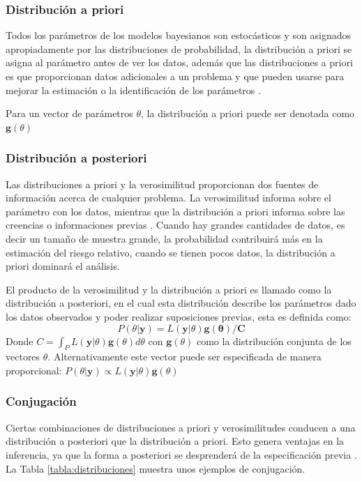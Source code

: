 \subsubsection{Distribución a priori}
Todos los parámetros de los modelos bayesianos son estocásticos y son asignados apropiadamente por las distribuciones de probabilidad, la distribución a priori se asigna al parámetro antes de ver los datos, además que las distribuciones a priori es que proporcionan datos adicionales a un problema y que pueden usarse para mejorar la estimación o la identificación de los parámetros \citep{lawson2018bayesian}.

Para un vector de parámetros $\theta$, la distribución a priori puede ser denotada como $\mathbf{g}(\theta)$

\subsubsection{Distribución a posteriori}
Las distribuciones a priori y la verosimilitud proporcionan dos fuentes de información acerca de cualquier problema. La verosimilitud informa sobre el parámetro con los datos, mientras que la distribución a priori informa sobre las creencias o informaciones previas \citep{lawson2018bayesian}. Cuando hay grandes cantidades de datos, es decir un tamaño de muestra grande, la probabilidad contribuirá más en la estimación del riesgo relativo, cuando se tienen pocos datos, la distribución a priori dominará el análisis.

El producto de la verosimilitud y la distribución a priori es llamado como la distribución a posteriori, en el cual esta distribución describe los parámetros dado los datos observados y poder realizar suposiciones previas, esta es definida como:
$$
P(\theta | \mathbf{y}) = L(\mathbf{y} | \theta)\mathbf{g(\theta)/C}
$$
Donde $C = \int_{P}^{}L(\mathbf{y}|\theta)\mathbf{g}(\theta)d\theta$ con $\mathbf{g}(\theta)$ como la distribución conjunta de los vectores $\theta$. Alternativamente este vector puede ser especificada de manera proporcional: $P(\theta | \mathbf{y}) \propto L (\mathbf{y} | \theta)\mathbf{g}(\theta)$

\subsubsection{Conjugación}
Ciertas combinaciones de distribuciones a priori y verosimilitudes conducen a una distribución a posteriori que la distribución a priori. Esto genera ventajas en la inferencia, ya que la forma a posteriori se desprenderá de la especificación previa \citep{lawson2018bayesian}. La Tabla \ref{tabla:distribuciones} muestra unos ejemplos de conjugación.

